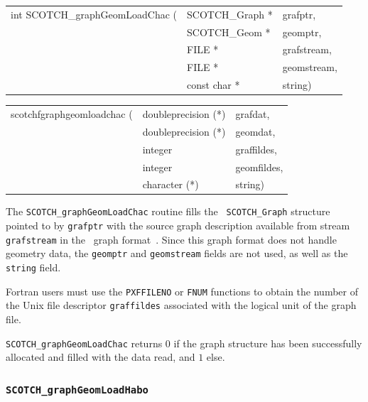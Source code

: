 \begin{itemize}
\progsyn

{\tt\begin{tabular}{l@{}ll}
int SCOTCH\_graphGeomLoadChac ( & SCOTCH\_Graph * & grafptr,    \\
                                & SCOTCH\_Geom *  & geomptr,    \\
                                & FILE *          & grafstream, \\
                                & FILE *          & geomstream, \\
                                & const char *    & string)
\end{tabular}}

{\tt\begin{tabular}{l@{}ll}
scotchfgraphgeomloadchac ( & doubleprecision (*) & grafdat,    \\
                           & doubleprecision (*) & geomdat,    \\
                           & integer             & graffildes, \\
                           & integer             & geomfildes, \\
                           & character (*)       & string)
\end{tabular}}

\progdes

The {\tt SCOTCH\_graphGeomLoadChac} routine fills the {\tt
SCOTCH\_\lbt Graph} structure pointed to by {\tt grafptr} with the
source graph description available from stream {\tt graf\lbt stream}
in the \chaco\ graph format~\cite{hele93c}. Since this graph format
does not handle geometry data, the {\tt geomptr} and
{\tt geom\lbt stream} fields are not used, as well as the {\tt string}
field.

Fortran users must use the {\tt PXFFILENO} or {\tt FNUM} functions to
obtain the number of the Unix file descriptor {\tt graf\lbt fildes}
associated with the logical unit of the graph file.

\progret

{\tt SCOTCH\_graphGeomLoadChac} returns $0$ if the graph structure has
been successfully allocated and filled with the data read, and $1$ else.
\end{itemize}

\subsubsection{{\tt SCOTCH\_graphGeomLoadHabo}}

